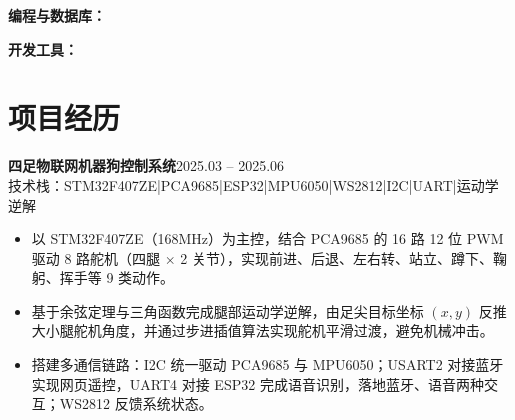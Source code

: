 \documentclass[10pt,a4paper]{article}
\newcommand{\projectblock}[3]{%
    {\bfseries\color{darktext}#1}\hfill{\color{graytext}#2}\\%
    {\small\color{graytext}#3}%
    \vspace{0.2em}%
}
\begin{document}
\vspace{2pt}

{\bfseries\color{primary}编程与数据库：}

\vspace{2pt}

{\bfseries\color{primary}开发工具：}

\section{\faProjectDiagram\hspace{0.4em}项目经历}

\projectblock{四足物联网机器狗控制系统}{2025.03 -- 2025.06}{技术栈：STM32F407ZE\hspace{0.3em}|\hspace{0.3em}PCA9685\hspace{0.3em}|\hspace{0.3em}ESP32\hspace{0.3em}|\hspace{0.3em}MPU6050\hspace{0.3em}|\hspace{0.3em}WS2812\hspace{0.3em}|\hspace{0.3em}I2C\hspace{0.3em}|\hspace{0.3em}UART\hspace{0.3em}|\hspace{0.3em}运动学逆解}

\begin{itemize}[leftmargin=1.5em, itemsep=2pt, parsep=0pt, topsep=2pt]
    \item 以 STM32F407ZE（168MHz）为主控，结合 PCA9685 的 16 路 12 位 PWM 驱动 8 路舵机（四腿 $\times$ 2 关节），实现前进、后退、左右转、站立、蹲下、鞠躬、挥手等 9 类动作。
    \item 基于余弦定理与三角函数完成腿部运动学逆解，由足尖目标坐标 $(x, y)$ 反推大小腿舵机角度，并通过步进插值算法实现舵机平滑过渡，避免机械冲击。
    \item 搭建多通信链路：I2C 统一驱动 PCA9685 与 MPU6050；USART2 对接蓝牙实现网页遥控，UART4 对接 ESP32 完成语音识别，落地蓝牙、语音两种交互；WS2812 反馈系统状态。
\end{itemize}
\end{document}
